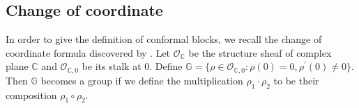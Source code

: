 \documentclass[11pt,b5paper,notitlepage]{article}
\theoremstyle{definition}
\newtheorem{df}{Definition}[section]
\theoremstyle{plain}
\newtheorem{pp}[df]{Proposition}
\newcommand{\wtd}{\widetilde}
\newcommand{\Vbb}{\mathbb V}
\newcommand{\Wbb}{\mathbb W}
\newcommand{\Gbb}{\mathbb G}
\newcommand{\Cbb}{\mathbb C}
\newcommand{\Nbb}{\mathbb N}
\newcommand{\cbf}{\mathbf c}
\newcommand{\wt}{\mathrm{wt}}
\newcommand{\Lss}{{L(0)_\mathrm{s}}}
\newcommand{\Lni}{{L(0)_\mathrm{n}}}
\newcommand{\<}{\left\langle}
\renewcommand{\>}{\right\rangle}
\newcommand{\MO}{\mathcal{O}}
\numberwithin{equation}{section}
\begin{document}
\begin{comment}
Suppose $\Wbb$ is a finitely admissible $\Vbb^{\times N}$-module with $\widetilde{L}(0)$-grading
$$
\Wbb=\bigoplus_{n\in \Nbb}\Wbb(n).
$$
The grading property $[\widetilde{L}_j(0),Y_i(v)_n]=\delta_{i,j}\big(Y_i(L(0)v)_n-(n+1)Y_i(v)_n\big)$ implies 
\begin{equation}\label{modulegrading}
Y_i(v)_m \Wbb(n)\subset \Wbb(n+\wt(v)-m-1)
\end{equation}
for homogeneous $v\in \Vbb$. By taking $v=\cbf$ in (\ref{modulegrading}), we see $L_i(n)$ lowers the $\wtd{L}(0)$-weight by $n$ and $\Wbb(n)$ is $L_i(0)$-invariant. We can decompose $L_0\vert_{\Wbb(n)}$ for each $n\in \Nbb$ by Jordan decomposition theorem in linear algebra, and then we get $L_0=\Lss+\Lni$ on $\Wbb$, where $\Lss$ is the semisimple part and $\Lni$ is the nilpotent part.\index{A@$\Lss,\Lni$} From this construction, we can see $\Lss$ and $\Lni$ preserve each $\Wbb(n)$. Denote the $\Lss$-grading of $\Wbb$ as 
$$
\Wbb=\bigoplus_{n\in \Cbb}\Wbb_{[n]}.
$$
\begin{pp}
    For each homogeneous $v\in \Vbb$, we have
    $$
    Y_\Wbb(v)_m \Wbb_{[n]}\subset \Wbb_{[n+\wt(v)-m-1]},
    $$
    and equivalently, $[\Lss,Y_\Wbb(v)_n]=Y_\Wbb(L_0 v)_n-(n+1)Y_\Wbb(v)_n$.
\end{pp}
\begin{df}
    Suppose $\Wbb$ is a $\Vbb$-module. 
    \begin{enumerate}
        \item[(1)] We say $\Wbb$ is \textbf{$\Lss$-semisimple}, if there exists a finite set $E\subset \Cbb$, such that 
    $$
    \Wbb=\bigoplus_{n\in E+\Nbb}\Wbb_{[n]}, \quad \dim \Wbb_{[n]}<\infty.
    $$
    \item[(2)] We say $\Wbb$ is \textbf{finitely generated} if there exists a finite subsets $\mathfrak{S}\subset \Wbb$, such that the smallest $\Vbb$-invariant subspace of $\Wbb$ containing $\mathfrak{S}$ is $\Wbb$.
    \end{enumerate}
\end{df}\index{3@$\Lss$-semisimple modules, finitely generated modules}
\begin{pp}
    When $\Vbb$ is $C_2$-cofinite, a $\Vbb$-module $\Wbb$ is $\Lss$-semisimple if and only if it is finitely generated.
\end{pp}
\end{comment}
\subsection{Change of coordinate}
In order to give the definition of conformal blocks, we recall the change of coordinate formula discovered by \cite{Hua97}. Let $\MO_\Cbb$ be the structure sheaf of complex plane $\Cbb$ and $\MO_{\Cbb,0}$ be its stalk at 0. Define $\Gbb=\{\rho\in \MO_{\Cbb,0}:\rho(0)=0,\rho^\prime(0)\ne 0\}$. Then $\Gbb$ becomes a group if we define the multiplication $\rho_1\cdot \rho_2$ to be their composition $\rho_1\circ \rho_2$. \index{G@$\Gbb$}
\end{document}
